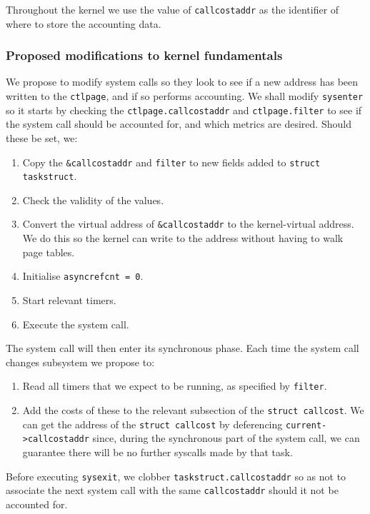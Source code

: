 \documentclass[12pt]{article}
\def\_{\textunderscore\-}
\begin{document}
Throughout the kernel we use the value of \texttt{call\_cost\_addr} as the identifier of where to store the accounting data.

  \subsubsection{Proposed modifications to kernel fundamentals}

We propose to modify system calls  so they look to see if a new address has been written to the \texttt{ctl\_page}, and if so performs accounting.
 We shall modify \texttt{sysenter} so it starts by checking the \texttt{ctl\_page.call\_cost\_addr} and \texttt{ctl\_page.filter} to see if the system call should be accounted for, and which metrics are desired. Should these be set, we:
  \begin{enumerate}
  \item Copy the \texttt{\&call\_cost\_addr} and \texttt{filter} to new fields added to \texttt{struct task\_struct}.
  \item Check the validity of the values.
  \item Convert the virtual address of \texttt{\&call\_cost\_addr} to the kernel-virtual address. We do this so the kernel can write to the address without having to walk page tables.
  \item Initialise \texttt{async\_ref\_cnt = 0}.
  \item Start relevant timers.
  \item Execute the system call.
  \end{enumerate}

  The system call will then enter its synchronous phase. Each time the system call changes subsystem we propose to:
  \begin{enumerate}
  \item Read all timers that we expect to be running, as specified by \texttt{filter}.
  \item Add the costs of these to the relevant subsection of the \texttt{struct call\_cost}. We can get the address of the \texttt{struct call\_cost} by deferencing \texttt{current->call\_cost\_addr} since, during the synchronous part of the system call, we can guarantee there will be no further syscalls made by that task.
  \end{enumerate}

  Before executing \texttt{sysexit}, we clobber \texttt{task\_struct.call\_cost\_addr} so as not to associate the next system call with the same \texttt{call\_cost\_addr} should it not be accounted for.
\end{document}
